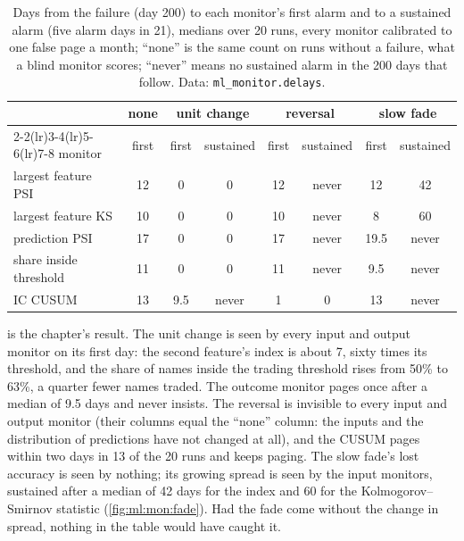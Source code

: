 \begin{table}[htbp]
\centering\small
\begin{tabular}{@{}lccccccc@{}}
\toprule
 & none & \multicolumn{2}{c}{unit change} & \multicolumn{2}{c}{reversal} & \multicolumn{2}{c}{slow fade}\\
\cmidrule(lr){2-2}\cmidrule(lr){3-4}\cmidrule(lr){5-6}\cmidrule(lr){7-8}
monitor & first & first & sustained & first & sustained & first & sustained\\
\midrule
largest feature PSI & 12 & 0 & 0 & 12 & never & 12 & 42\\
largest feature KS & 10 & 0 & 0 & 10 & never & 8 & 60\\
prediction PSI & 17 & 0 & 0 & 17 & never & 19.5 & never\\
share inside threshold & 11 & 0 & 0 & 11 & never & 9.5 & never\\
IC CUSUM & 13 & 9.5 & never & 1 & 0 & 13 & never\\
\bottomrule
\end{tabular}
\caption{Days from the failure (day 200) to each monitor's first alarm and to a sustained alarm (five alarm days in 21), medians
over 20 runs, every monitor calibrated to one false page a month; ``none'' is the same count on runs without a failure, what a
blind monitor scores; ``never'' means no sustained alarm in the 200 days that follow. Data: \texttt{ml\_monitor.delays}.}
\label{tab:ml:mon:delays}
\end{table}

 is the chapter's result. The unit change is seen by every input and output monitor on its first day:
the second feature's index is about 7, sixty times its threshold, and the share of names inside the trading threshold rises from
50\% to 63\%, a quarter fewer names traded. The outcome monitor pages once after a median of 9.5 days and never insists. The
reversal is invisible to every input and output monitor (their columns equal the ``none'' column: the inputs and the
distribution of predictions have not changed at all), and the CUSUM pages within two days in 13 of the 20 runs and keeps paging. The
slow fade's lost accuracy is seen by nothing; its growing spread is seen by the input monitors, sustained after a median of 42
days for the index and 60 for the Kolmogorov--Smirnov statistic (\cref{fig:ml:mon:fade}). Had the fade come without the change
in spread, nothing in the table would have caught it.

